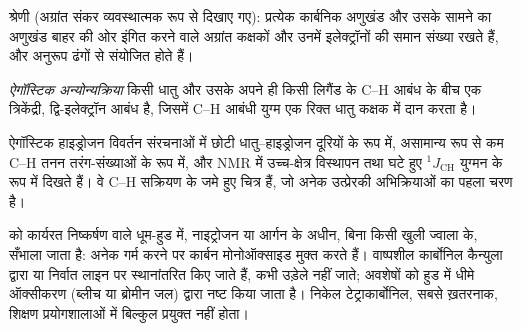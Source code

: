 \begin{omfigure}

{\small {} श्रेणी (अग्रांत संकर व्यवस्थात्मक रूप से दिखाए गए): प्रत्येक कार्बनिक
अणुखंड और उसके सामने का  अणुखंड बाहर की ओर इंगित करने वाले
अग्रांत कक्षकों और उनमें इलेक्ट्रॉनों की समान संख्या रखते हैं, और
अनुरूप ढंगों से संयोजित होते हैं।}
\end{omfigure}

\begin{definition}[ऐगॉस्टिक अन्योन्यक्रिया]\label{def:b3:organometallic-bonding:agostic}
\emph{ऐगॉस्टिक अन्योन्यक्रिया} किसी धातु और उसके अपने ही किसी लिगैंड के
C--H आबंध के बीच एक त्रिकेंद्री, द्वि-इलेक्ट्रॉन आबंध है, जिसमें
C--H आबंधी युग्म एक रिक्त धातु कक्षक में दान करता है।
\end{definition}

ऐगॉस्टिक हाइड्रोजन विवर्तन संरचनाओं में छोटी धातु--हाइड्रोजन दूरियों के रूप में,
असामान्य रूप से कम C--H तनन तरंग-संख्याओं के रूप में, और NMR में
उच्च-क्षेत्र विस्थापन तथा घटे हुए $^1J_{\mathrm{CH}}$ युग्मन के रूप में दिखते हैं। वे
C--H सक्रियण के जमे हुए चित्र हैं, जो अनेक उत्प्रेरकी अभिक्रियाओं का पहला चरण है।

\begin{inthelab}[धातु कार्बोनिलों के साथ कार्य]
 को कार्यरत निष्कर्षण वाले धूम-हुड में, नाइट्रोजन या आर्गन के अधीन,
बिना किसी खुली ज्वाला के, सँभाला जाता है: अनेक गर्म करने पर कार्बन मोनोऑक्साइड मुक्त करते हैं।
वाष्पशील कार्बोनिल कैन्युला द्वारा या निर्वात लाइन पर स्थानांतरित किए जाते हैं, कभी
उड़ेले नहीं जाते; अवशेषों को हुड में धीमे ऑक्सीकरण (ब्लीच या ब्रोमीन जल) द्वारा नष्ट किया
जाता है। निकेल टेट्राकार्बोनिल, सबसे ख़तरनाक, शिक्षण
प्रयोगशालाओं में बिल्कुल प्रयुक्त नहीं होता।
\end{inthelab}

